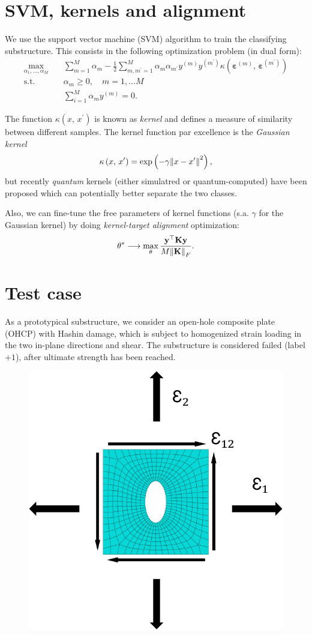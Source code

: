 \documentclass[9pt,a4paper]{extarticle}
\begin{document}
\begin{multicols}{2}
\section{SVM, kernels and alignment}
We use the support vector machine (SVM) algorithm to train the classifying substructure. This consists in the following optimization problem (in dual form):
\begin{displaymath}
    \begin{aligned}
      \max_{\alpha_1,\dots, \alpha_M} \quad & \sum_{m=1}^{M}\alpha_m - \frac{1}{2}\sum_{m,m^\prime=1}^{M}\alpha_m\alpha_{m^\prime}y^{(m)}y^{(m^\prime)}\kappa\left( \bm{\varepsilon}^{(m)},\, \bm{\varepsilon}^{(m^\prime)} \right) \\
      \mathrm{s.t.}\quad & \alpha_m \geq 0,\quad m=1,\dots M \\
      & \sum_{i=1}^M \alpha_m y^{(m)} = 0.
    \end{aligned}
\end{displaymath}

The function $\kappa\left(x,\, x^\prime\right)$ is known as \emph{kernel} and defines a measure of similarity between different samples. The kernel function par excellence is the \emph{Gaussian kernel} 
\[\kappa\left(x,\, x^\prime\right) = \exp\left( -\gamma \norm{x - x^\prime}^2 \right),\]
but recently \emph{quantum} kernels \cite{Havlicek} (either simulatred or quantum-computed) have been proposed which can potentially better separate the two classes.

Also, we can fine-tune the free parameters of kernel functions (s.a. $\gamma$ for the Gaussian kernel) by doing \emph{kernel-target alignment} optimization:
\[
    \theta^* \longrightarrow \max_\theta \frac{\mathbf{y}^\top \mathbf{K} \mathbf{y}}{M \norm{\mathbf{K}}_F}.
\]


\section{Test case}
As a prototypical substructure, we consider an open-hole composite plate (OHCP) with Hashin damage, which is subject to homogenized strain loading in the two in-plane directions and shear. The substructure is considered failed (label $+1$), after ultimate strength has been reached.
\begin{figure}[H]
    \centering
    \includegraphics[width=.3\textwidth]{pics/ohcp-geom-loads.pdf}
\end{figure}


\end{multicols}
\end{document}
